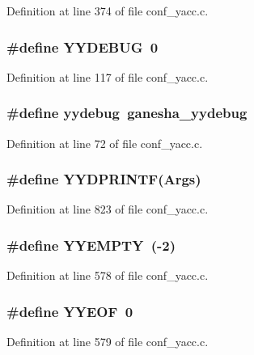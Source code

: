 Definition at line 374 of file conf\_\-yacc.c.
\subsubsection[{YYDEBUG}]{\setlength{\rightskip}{0pt plus 5cm}\#define YYDEBUG~0}\label{conf__yacc_8c_a853b3bfad6d2b2ff693dce81182e0c2e}


Definition at line 117 of file conf\_\-yacc.c.
\subsubsection[{yydebug}]{\setlength{\rightskip}{0pt plus 5cm}\#define yydebug~ganesha\_\-yydebug}\label{conf__yacc_8c_a7fde6236fcb0f6e5d1d20ce98d9f0d01}


Definition at line 72 of file conf\_\-yacc.c.
\subsubsection[{YYDPRINTF}]{\setlength{\rightskip}{0pt plus 5cm}\#define YYDPRINTF(Args)}\label{conf__yacc_8c_af6d6ca80e87922f90264f1a4a802ea04}


Definition at line 823 of file conf\_\-yacc.c.
\subsubsection[{YYEMPTY}]{\setlength{\rightskip}{0pt plus 5cm}\#define YYEMPTY~(-\/2)}\label{conf__yacc_8c_ae59196b3765411a06cf234cf9bcae2e7}


Definition at line 578 of file conf\_\-yacc.c.
\subsubsection[{YYEOF}]{\setlength{\rightskip}{0pt plus 5cm}\#define YYEOF~0}\label{conf__yacc_8c_a3b1e3628411fabac03abe0a337322016}


Definition at line 579 of file conf\_\-yacc.c.
